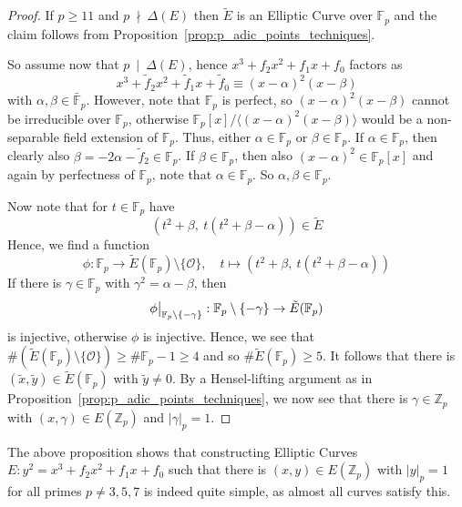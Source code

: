 \documentclass{scrartcl}
\newcommand{\Z}{\mathbb{Z}}
\newcommand{\F}{\mathbb{F}}
\renewcommand{\O}{\mathcal{O}}
\newcommand{\notdivides}{\ \nmid \ }
\newcommand{\divides}{\ \mid \ }
\newcommand\restr[2]{{
    \left.\kern-\nulldelimiterspace
    #1
    \vphantom{\big|}
    \right|_{#2}
}}
\theoremstyle{definition}
\begin{document}
\begin{proof}
    If $p \geq 11$ and $p \notdivides \Delta(E)$ then $\tilde{E}$ is an Elliptic Curve over $\F_p$ and the claim follows from Proposition~\ref{prop:p_adic_points_techniques}.
    
    So assume now that $p \divides \Delta(E)$, hence $x^3 + f_2 x^2 + f_1 x + f_0$ factors as
    \begin{equation*}
        x^3 + \tilde{f}_2 x^2 + \tilde{f}_1 x + \tilde{f}_0 \equiv (x - \alpha)^2(x - \beta)
    \end{equation*}
    with $\alpha, \beta \in \bar{\F}_p$.
    However, note that $\F_p$ is perfect, so $(x - \alpha)^2(x - \beta)$ cannot be irreducible over $\F_p$, otherwise $\F_p[x] / \langle(x - \alpha)^2(x - \beta)\rangle$ would be a non-separable field extension of $\F_p$.
    Thus, either $\alpha \in \F_p$ or $\beta \in \F_p$.
    If $\alpha \in \F_p$, then clearly also $\beta = -2\alpha - \tilde{f}_2 \in \F_p$.
    If $\beta \in \F_p$, then also $(x - \alpha)^2 \in \F_p[x]$ and again by perfectness of $\F_p$, note that $\alpha \in \F_p$.
    So $\alpha, \beta \in \F_p$.

    Now note that for $t \in \F_p$ have
    \begin{equation*}
        \left( t^2 + \beta, \ t (t^2 + \beta - \alpha) \right) \in \tilde{E}
    \end{equation*}
    Hence, we find a function
    \begin{equation*}
        \phi: \F_p \to \tilde{E}(\F_p) \setminus \{\O\}, \quad t \mapsto \left( t^2 + \beta, \ t (t^2 + \beta - \alpha) \right)
    \end{equation*}
    If there is $\gamma \in \F_p$ with $\gamma^2 = \alpha - \beta$, then 
    \begin{equation*}
        \restr{\phi}{\F_p \setminus \{-\gamma\}}: \F_p \setminus \{-\gamma\} \to \tilde{E}(\F_p)
    \end{equation*}
    is injective, otherwise $\phi$ is injective.
    Hence, we see that $\#(\tilde{E}(\F_p) \setminus \{\O\}) \geq \#\F_p - 1 \geq 4$ and so $\#\tilde{E}(\F_p) \geq 5$.
    It follows that there is $(\tilde{x}, \tilde{y}) \in \tilde{E}(\F_p)$ with $\tilde{y} \neq 0$.
    By a Hensel-lifting argument as in Proposition~\ref{prop:p_adic_points_techniques}, we now see that there is $\gamma \in \Z_p$ with $(x, \gamma) \in E(\Z_p)$ and $|\gamma|_p = 1$.
\end{proof}
The above proposition shows that constructing Elliptic Curves $E: y^2 = x^3 + f_2 x^2 + f_1 x + f_0$ such that there is $(x, y) \in E(\Z_p)$ with $|y|_p = 1$ for all primes $p \neq 3, 5, 7$ is indeed quite simple, as almost all curves satisfy this.
\end{document}
